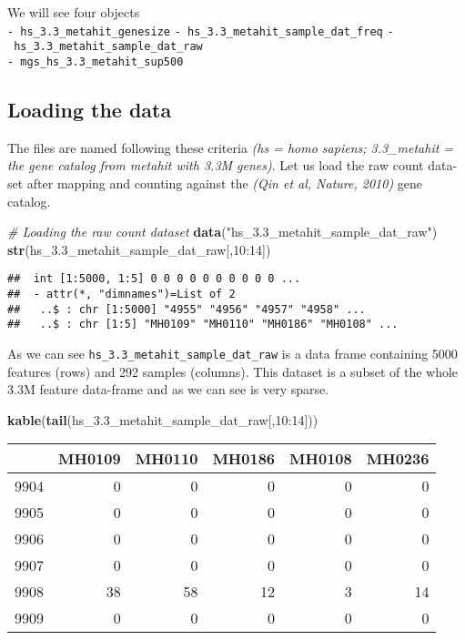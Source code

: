 \documentclass[]{article}
\newenvironment{Shaded}{\begin{snugshade}}{\end{snugshade}}
\newcommand{\KeywordTok}[1]{\textcolor[rgb]{0.13,0.29,0.53}{\textbf{{#1}}}}
\newcommand{\DecValTok}[1]{\textcolor[rgb]{0.00,0.00,0.81}{{#1}}}
\newcommand{\StringTok}[1]{\textcolor[rgb]{0.31,0.60,0.02}{{#1}}}
\newcommand{\CommentTok}[1]{\textcolor[rgb]{0.56,0.35,0.01}{\textit{{#1}}}}
\newcommand{\NormalTok}[1]{{#1}}
\begin{document}
We will see four objects\\
\texttt{-\ hs\_3.3\_metahit\_genesize}
\texttt{-\ hs\_3.3\_metahit\_sample\_dat\_freq}
\texttt{-\ hs\_3.3\_metahit\_sample\_dat\_raw}\\
\texttt{-\ mgs\_hs\_3.3\_metahit\_sup500}

\subsection{Loading the data}\label{loading-the-data}

The files are named following these criteria \emph{(hs = homo sapiens;
3.3\_metahit = the gene catalog from metahit with 3.3M genes)}. Let us
load the raw count data-set after mapping and counting against the
\emph{(Qin et al, Nature, 2010)} gene catalog.

\begin{Shaded}
\begin{Highlighting}[]
\CommentTok{# Loading the raw count dataset}
\KeywordTok{data}\NormalTok{(}\StringTok{"hs_3.3_metahit_sample_dat_raw"}\NormalTok{)}
\KeywordTok{str}\NormalTok{(hs_3.3_metahit_sample_dat_raw[,}\DecValTok{10}\NormalTok{:}\DecValTok{14}\NormalTok{])}
\end{Highlighting}
\end{Shaded}

\begin{verbatim}
##  int [1:5000, 1:5] 0 0 0 0 0 0 0 0 0 0 ...
##  - attr(*, "dimnames")=List of 2
##   ..$ : chr [1:5000] "4955" "4956" "4957" "4958" ...
##   ..$ : chr [1:5] "MH0109" "MH0110" "MH0186" "MH0108" ...
\end{verbatim}

As we can see \texttt{hs\_3.3\_metahit\_sample\_dat\_raw} is a data
frame containing 5000 features (rows) and 292 samples (columns). This
dataset is a subset of the whole 3.3M feature data-frame and as we can
see is very sparse.

\begin{Shaded}
\begin{Highlighting}[]
\KeywordTok{kable}\NormalTok{(}\KeywordTok{tail}\NormalTok{(hs_3.3_metahit_sample_dat_raw[,}\DecValTok{10}\NormalTok{:}\DecValTok{14}\NormalTok{]))}
\end{Highlighting}
\end{Shaded}

\begin{longtable}[c]{@{}lrrrrr@{}}
\toprule
& MH0109 & MH0110 & MH0186 & MH0108 & MH0236\tabularnewline
\midrule
\endhead
9904 & 0 & 0 & 0 & 0 & 0\tabularnewline
9905 & 0 & 0 & 0 & 0 & 0\tabularnewline
9906 & 0 & 0 & 0 & 0 & 0\tabularnewline
9907 & 0 & 0 & 0 & 0 & 0\tabularnewline
9908 & 38 & 58 & 12 & 3 & 14\tabularnewline
9909 & 0 & 0 & 0 & 0 & 0\tabularnewline
\bottomrule
\end{longtable}
\end{document}
